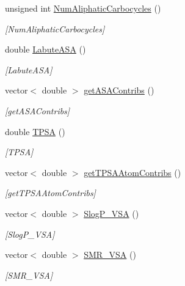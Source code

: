 \begin{DoxyCompactItemize}
unsigned int \mbox{\hyperlink{class_molecule_a4953b86e7456967bb605bdb61c15b1aa}{Num\+Aliphatic\+Carbocycles}} ()
\begin{DoxyCompactList}\small\item\em \mbox{[}Num\+Aliphatic\+Carbocycles\mbox{]} \end{DoxyCompactList}\item 
double \mbox{\hyperlink{class_molecule_a3ed0d0c3a496259b3e030dcfc2e37e39}{Labute\+A\+SA}} ()
\begin{DoxyCompactList}\small\item\em \mbox{[}Labute\+A\+SA\mbox{]} \end{DoxyCompactList}\item 
vector$<$ double $>$ \mbox{\hyperlink{class_molecule_a6788d32036ced74e382310e93629b785}{get\+A\+S\+A\+Contribs}} ()
\begin{DoxyCompactList}\small\item\em \mbox{[}get\+A\+S\+A\+Contribs\mbox{]} \end{DoxyCompactList}\item 
double \mbox{\hyperlink{class_molecule_ac5e52f33289342df7147a7151890df95}{T\+P\+SA}} ()
\begin{DoxyCompactList}\small\item\em \mbox{[}T\+P\+SA\mbox{]} \end{DoxyCompactList}\item 
vector$<$ double $>$ \mbox{\hyperlink{class_molecule_ab277cc8d75ec0bfafe2e40aa3d960e4b}{get\+T\+P\+S\+A\+Atom\+Contribs}} ()
\begin{DoxyCompactList}\small\item\em \mbox{[}get\+T\+P\+S\+A\+Atom\+Contribs\mbox{]} \end{DoxyCompactList}\item 
vector$<$ double $>$ \mbox{\hyperlink{class_molecule_aaf27b23a3849ca9ec2cf2df6ee591244}{Slog\+P\+\_\+\+V\+SA}} ()
\begin{DoxyCompactList}\small\item\em \mbox{[}Slog\+P\+\_\+\+V\+SA\mbox{]} \end{DoxyCompactList}\item 
vector$<$ double $>$ \mbox{\hyperlink{class_molecule_a839c9f1848b3b0c953ca7f4902e86086}{S\+M\+R\+\_\+\+V\+SA}} ()
\begin{DoxyCompactList}\small\item\em \mbox{[}S\+M\+R\+\_\+\+V\+SA\mbox{]} \end{DoxyCompactList}\item 

\end{DoxyCompactItemize}
